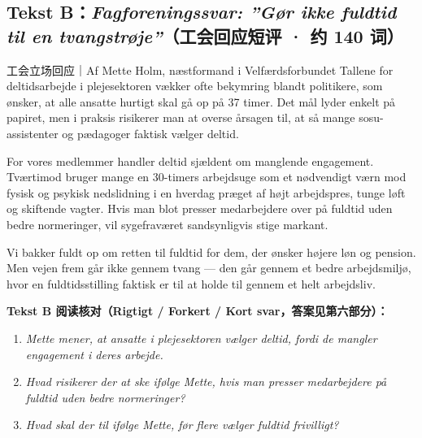 \subsection*{Tekst B：\textit{Fagforeningssvar: ”Gør ikke fuldtid til en tvangstrøje”}（工会回应短评 · 约 140 词）}

\begin{emailbox}{工会立场回应｜Af Mette Holm, næstformand i Velfærdsforbundet}
Tallene for deltidsarbejde i plejesektoren vækker ofte bekymring blandt politikere, som ønsker, at alle ansatte hurtigt skal gå op på 37 timer. Det mål lyder enkelt på papiret, men i praksis risikerer man at overse årsagen til, at så mange sosu-assistenter og pædagoger faktisk vælger deltid.

For vores medlemmer handler deltid sjældent om manglende engagement. Tværtimod bruger mange en 30-timers arbejdsuge som et nødvendigt værn mod fysisk og psykisk nedslidning i en hverdag præget af højt arbejdspres, tunge løft og skiftende vagter. Hvis man blot presser medarbejdere over på fuldtid uden bedre normeringer, vil sygefraværet sandsynligvis stige markant.

Vi bakker fuldt op om retten til fuldtid for dem, der ønsker højere løn og pension. Men vejen frem går ikke gennem tvang --- den går gennem et bedre arbejdsmiljø, hvor en fuldtidsstilling faktisk er til at holde til gennem et helt arbejdsliv.
\end{emailbox}

\textbf{Tekst B 阅读核对（Rigtigt / Forkert / Kort svar，答案见第六部分）：}
\begin{enumerate}
  \item \textit{Mette mener, at ansatte i plejesektoren vælger deltid, fordi de mangler engagement i deres arbejde.} \underline{\hspace{2.2cm}}
  \item \textit{Hvad risikerer der at ske ifølge Mette, hvis man presser medarbejdere på fuldtid uden bedre normeringer?} \underline{\hspace{2.2cm}}
  \item \textit{Hvad skal der til ifølge Mette, før flere vælger fuldtid frivilligt?} \underline{\hspace{2.2cm}}
\end{enumerate}

